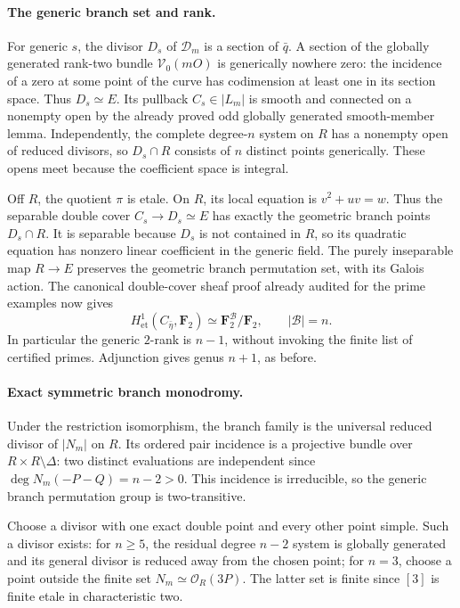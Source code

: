\paragraph{The generic branch set and rank.}
For generic \(s\), the divisor \(D_s\) of \(\mathcal D_m\)
is a section of \(\bar q\). A section of the globally generated
rank-two bundle \(\mathcal V_0(mO)\) is generically nowhere zero:
the incidence of a zero at some point of the curve has codimension
at least one in its section space. Thus \(D_s\simeq E\).
Its pullback \(C_s\in|L_m|\) is smooth and connected on a
nonempty open by the already proved odd globally generated
smooth-member lemma. Independently, the complete degree-\(n\)
system on \(R\) has a nonempty open of reduced divisors, so
\(D_s\cap R\) consists of \(n\) distinct points generically.
These opens meet because the coefficient space is integral.

Off \(R\), the quotient \(\pi\) is etale. On \(R\), its
local equation is \(v^2+uv=w\). Thus the separable double cover
\(C_s\to D_s\simeq E\) has exactly the geometric branch
points \(D_s\cap R\). It is separable because \(D_s\) is not
contained in \(R\), so its quadratic equation has nonzero linear
coefficient in the generic field. The purely inseparable map
\(R\to E\) preserves the geometric branch permutation set,
with its Galois action. The canonical double-cover sheaf proof
already audited for the prime examples now gives
\[
 H^1_{\mathrm{et}}(C_{\bar\eta},\mathbf F_2)
          \simeq \mathbf F_2^{\mathcal B}/\mathbf F_2,
 \qquad |\mathcal B|=n.
\]
In particular the generic \(2\)-rank is \(n-1\), without invoking
the finite list of certified primes. Adjunction gives genus
\(n+1\), as before.

\paragraph{Exact symmetric branch monodromy.}
Under the restriction isomorphism, the branch family is the
universal reduced divisor of \(|N_m|\) on \(R\). Its ordered
pair incidence is a projective bundle over
\(R\times R\setminus\Delta\): two distinct evaluations are
independent since \(\deg N_m(-P-Q)=n-2>0\). This incidence
is irreducible, so the generic branch permutation group is
two-transitive.

Choose a divisor with one exact double point and every other
point simple. Such a divisor exists: for \(n\ge5\), the
residual degree \(n-2\) system is globally generated and its
general divisor is reduced away from the chosen point; for
\(n=3\), choose a point outside the finite set
\(N_m\simeq\mathcal O_R(3P)\). The latter set is finite since
\([3]\) is finite etale in characteristic two.

